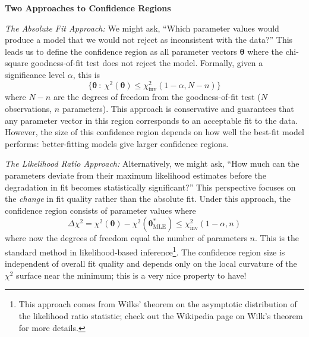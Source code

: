 \begin{definitionBox}
\textbf{Two Approaches to Confidence Regions}

\textit{The Absolute Fit Approach:} We might ask, ``Which parameter values would produce a model that we would not reject as inconsistent with the data?'' This leads us to define the confidence region as all parameter vectors $\boldsymbol{\theta}$ where the chi-square goodness-of-fit test does not reject the model. Formally, given a significance level $\alpha$, this is
\begin{equation}
    \{\boldsymbol{\theta} \ : \ \chi^2(\boldsymbol{\theta}) \leq \chi^2_{\text{inv}}(1-\alpha, N-n)\}
\end{equation}
where $N-n$ are the degrees of freedom from the goodness-of-fit test ($N$ observations, $n$ parameters). This approach is conservative and guarantees that any parameter vector in this region corresponds to an acceptable fit to the data. However, the size of this confidence region depends on how well the best-fit model performs: better-fitting models give larger confidence regions.

\textit{The Likelihood Ratio Approach:} Alternatively, we might ask, ``How much can the parameters deviate from their maximum likelihood estimates before the degradation in fit becomes statistically significant?'' This perspective focuses on the \textit{change} in fit quality rather than the absolute fit. Under this approach, the confidence region consists of parameter values where
\begin{equation}
    \Delta\chi^2 = \chi^2(\boldsymbol{\theta}) - \chi^2(\boldsymbol{\theta}^*_{\text{MLE}}) \leq \chi^2_{\text{inv}}(1-\alpha, n)
\end{equation}
where now the degrees of freedom equal the number of parameters $n$. This is the standard method in likelihood-based inference\footnote{This approach comes from Wilks' theorem on the asymptotic distribution of the likelihood ratio statistic; check out the Wikipedia page on Wilk's theorem for more details.}. The confidence region size is independent of overall fit quality and depends only on the local curvature of the $\chi^2$ surface near the minimum; this is a very nice property to have!

\vspace{0.2cm}


\end{definitionBox}
